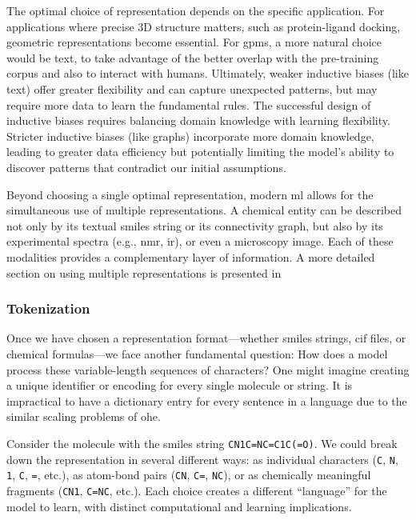 The optimal choice of representation depends on the specific application. For applications where precise 3D structure matters, such as protein-ligand docking, geometric representations become essential.
For \glspl{gpm}, a more natural choice would be text, to take advantage of the better overlap with the pre-training corpus and also to interact with humans. 
Ultimately, weaker inductive biases (like text) offer greater flexibility and can capture unexpected patterns, but may require more data to learn the fundamental rules. 
The successful design of inductive biases requires balancing domain knowledge with learning flexibility. 
Stricter inductive biases (like graphs) incorporate more domain knowledge, leading to greater data efficiency but potentially limiting the model's ability to discover patterns that contradict our initial assumptions. 

Beyond choosing a single optimal representation, modern \gls{ml} allows for the simultaneous use of multiple representations. 
A chemical entity can be described not only by its textual \gls{smiles} string or its connectivity graph, but also by its experimental spectra (e.g., \gls{nmr}, \gls{ir}), or even a microscopy image. 
Each of these modalities provides a complementary layer of information. 
A more detailed section on using multiple representations is presented in 


\subsubsection{Tokenization}
Once we have chosen a representation format---whether \gls{smiles} strings, \gls{cif} files, or chemical formulas---we face another fundamental question: How does a model process these variable-length sequences of characters? 
One might imagine creating a unique identifier or encoding for every single molecule or string. 
It is impractical to have a dictionary entry for every sentence in a language due to the similar scaling problems of \gls{ohe}.

Consider the molecule with the \gls{smiles} string \texttt{CN1C=NC=C1C(=O)}. 
We could break down the representation in several different ways: as individual characters (\texttt{C}, \texttt{N}, \texttt{1}, \texttt{C}, \texttt{=}, etc.), as atom-bond pairs (\texttt{CN}, \texttt{C=}, \texttt{NC}), or as chemically meaningful fragments (\texttt{CN1}, \texttt{C=NC}, etc.). 
Each choice creates a different \enquote{language} for the model to learn, with distinct computational and learning implications.

